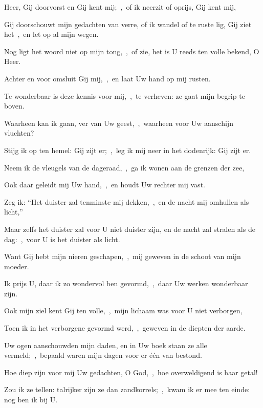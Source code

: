 \documentclass[12pt,twoside,a5paper]{article}
\begin{document}
\begin{halfparskip}

   Heer, Gij doorvorst en Gij kent mij;~\sep\ of ik neerzit of oprijs, Gij kent mij,


  Gij doorschouwt mijn gedachten van verre, of ik wandel of te ruste lig, Gij ziet het~\sep\ en let op al mijn wegen.

  Nog ligt het woord niet op mijn tong,~\sep\ of zie, het is U reeds ten volle bekend, O Heer.

  Achter en voor omsluit Gij mij,~\sep\ en laat Uw hand op mij rusten.

  Te wonderbaar is deze kennis voor mij,~\sep\ te verheven: ze gaat mijn begrip te boven.

  Waarheen kan ik gaan, ver van Uw geest,~\sep\ waarheen voor Uw aanschijn vluchten?

  Stijg ik op ten hemel: Gij zijt er;~\sep\ leg ik mij neer in het dodenrijk: Gij zijt er.

  Neem ik de vleugels van de dageraad,~\sep\ ga ik wonen aan de grenzen der zee,

  Ook daar geleidt mij Uw hand,~\sep\ en houdt Uw rechter mij vast.

  Zeg ik: ``Het duister zal tenminste mij dekken,~\sep\ en de nacht mij omhullen als licht,''

  Maar zelfs het duister zal voor U niet duister zijn, en de nacht zal stralen als de dag:~\sep\ voor U is het duister als licht.

  Want Gij hebt mijn nieren geschapen,~\sep\ mij geweven in de schoot van mijn moeder.

  Ik prijs U, daar ik zo wondervol ben gevormd,~\sep\ daar Uw werken wonderbaar zijn.

  Ook mijn ziel kent Gij ten volle,~\sep\ mijn lichaam was voor U niet verborgen,

  Toen ik in het verborgene gevormd werd,~\sep\ geweven in de diepten der aarde.

  Uw ogen aanschouwden mijn daden, en in Uw boek staan ze alle vermeld;~\sep\ bepaald waren mijn dagen voor er één van bestond.

  Hoe diep zijn voor mij Uw gedachten, O God,~\sep\ hoe overweldigend is haar getal!

  Zou ik ze tellen: talrijker zijn ze dan zandkorrels;~\sep\ kwam ik er mee ten einde: nog ben ik bij U.


\end{halfparskip}
\end{document}
